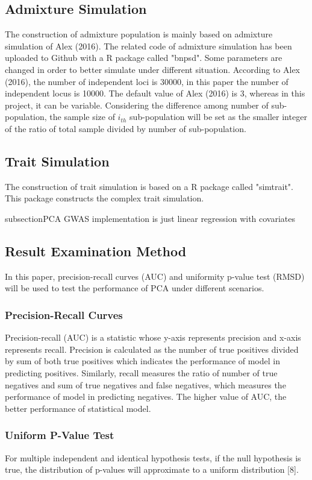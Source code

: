 \documentclass[12pt]{article}
\theoremstyle{definition}
\theoremstyle{plain}
\begin{document}
\subsection{Admixture Simulation}
The construction of admixture population is mainly based on admixture simulation of Alex (2016). The related code of admixture simulation has been uploaded to Github with a R package called "bnpsd".  Some parameters are changed in order to better simulate under different situation. According to Alex (2016), the number of independent loci is 30000, in this paper the number of independent locus is 10000. The default value of Alex (2016) is 3, whereas in this project, it can be variable. Considering the difference among number of sub-population, the sample size of $i_{th}$ sub-population will be set as the smaller integer of the ratio of total sample divided by number of sub-population. 



\subsection{Trait Simulation}
The construction of trait simulation is based on a R package called "simtrait". This package constructs the complex trait simulation. 

subsection{PCA GWAS implementation is just linear regression with covariates}

\subsection{Result Examination Method}
In this paper, precision-recall curves (AUC) and uniformity p-value test (RMSD) will be used to test the performance of PCA under different scenarios.
\subsubsection{Precision-Recall Curves}
Precision-recall (AUC) is a statistic whose y-axis represents precision and x-axis represents recall. Precision is calculated as the number of true positives divided by sum of both true positives which indicates the performance of model in predicting positives. Similarly, recall measures the ratio of number of true negatives and sum of true negatives and false negatives, which measures the performance of model in predicting negatives. The higher value of AUC, the better performance of statistical model.
\subsubsection{Uniform P-Value Test}
For multiple independent and identical hypothesis tests, if the null hypothesis is true, the distribution of p-values will approximate to a uniform distribution [8].   
\end{document}
